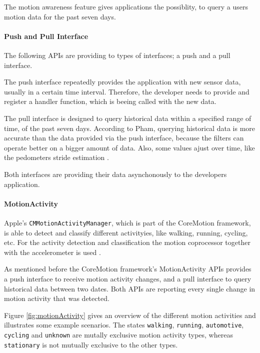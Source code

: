 The motion awareness feature gives applications the possiblity, to query a users motion data for the past seven days.

\paragraph{Push and Pull Interface}
The following \acsp{API} are providing to types of interfaces; a push and a pull interface.

The push interface repeatedly provides the application with new sensor data, usually in a certain time interval.
Therefore, the developer needs to provide and register a handler function, which is beeing called with the new data.

The pull interface is designed to query historical data within a specified range of time, of the past seven days.
According to Pham, querying historical data is more accurate than the data provided via the push interface, because the filters can operate better on a bigger amount of data.
Also, some values ajust over time, like the pedometers stride estimation \cite{wwdc_2014}.

Both interfaces are providing their data asynchonously to the developers application.


\paragraph{MotionActivity}

Apple's \texttt{CMMotionActivityManager}, which is part of the CoreMotion framework, is able to detect and classify different activityies, like walking, running, cycling, etc.
For the activity detection and classification the motion coprocessor together with the accelerometer is used \cite{wwdc_2014}.

As mentioned before the CoreMotion framework's MotionActivity \acsp{API} provides a push interface to receive motion activity changes, and a pull interface to query historical data between two dates.
Both \acsp{API} are reporting every single change in motion activity that was detected.

Figure \ref{fig:motionActivity} gives an overview of the different motion activities and illustrates some example scenarios.
The states \texttt{walking}, \texttt{running}, \texttt{automotive}, \texttt{cycling} and \texttt{unknown} are mutally exclusive motion activity types, whereas \texttt{stationary} is not mutually exclusive to the other types.

